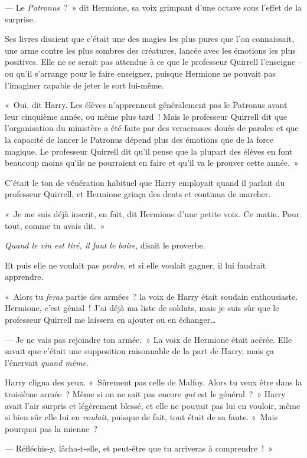 --- Le \emph{Patronus}~?~» dit Hermione, sa voix grimpant d'une octave sous l'effet de la surprise.

Ses livres disaient que c'était une des magies les plus pures que l'on connaissait, une arme contre les plus sombres des créatures, lancée avec les émotions les plus positives. Elle ne se serait pas attendue à ce que le professeur Quirrell l'enseigne -- ou qu'il s'arrange pour le faire enseigner, puisque Hermione ne pouvait pas l'imaginer capable de jeter le sort lui-même.

«~Oui, dit Harry. Les élèves n'apprennent généralement pas le Patronus avant leur cinquième année, ou même plus tard~! Mais le professeur Quirrell dit que l'organisation du ministère a été faite par des veracrasses doués de paroles et que la capacité de lancer le Patronus dépend plus des émotions que de la force magique. Le professeur Quirrell dit qu'il pense que la plupart des élèves en font beaucoup moins qu'ils ne pourraient en faire et qu'il va le prouver cette année.~»

C'était le ton de vénération habituel que Harry employait quand il parlait du professeur Quirrell, et Hermione grinça des dents et continua de marcher.

«~Je me suis déjà inscrit, en fait, dit Hermione d'une petite voix. Ce matin. Pour tout, comme tu avais dit.~»

\emph{Quand le vin est tiré, il faut le boire}, disait le proverbe.

Et puis elle ne voulait pas \emph{perdre}, et si elle voulait gagner, il lui faudrait apprendre.

«~Alors tu \emph{feras} partie des armées~? la voix de Harry était soudain enthousiaste. Hermione, c'est génial~! J'ai déjà ma liste de soldats, mais je suis sûr que le professeur Quirrell me laissera en ajouter ou en échanger…

--- Je ne vais pas rejoindre ton armée.~» La voix de Hermione était acérée. Elle savait que c'était une supposition raisonnable de la part de Harry, mais ça l'énervait \emph{quand même}.

Harry cligna des yeux. «~Sûrement pas celle de Malfoy. Alors tu veux être dans la troisième armée~? Même si on ne sait pas encore \emph{qui} est le général~?~» Harry avait l'air surpris et légèrement blessé, et elle ne pouvait pas lui en vouloir, même si bien sûr elle lui en \emph{voulait}, puisque de fait, tout était de sa faute. «~Mais pourquoi pas la mienne~?

--- Réfléchis-y, lâcha-t-elle, et peut-être que tu arriveras à comprendre~!~»

